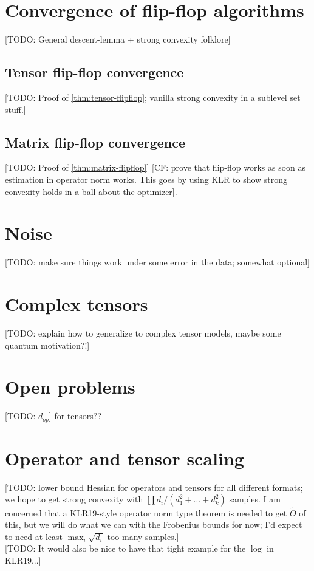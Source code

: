 \documentclass{article}
\newcommand{\CF}[1]{{\color{purple}[CF: #1]}}
\newcommand{\TODO}[1]{{\color{blue}[TODO: #1]}}
\begin{document}
\section{Convergence of flip-flop algorithms}
\TODO{General descent-lemma + strong convexity folklore}
\subsection{Tensor flip-flop convergence}
\TODO{Proof of \cref{thm:tensor-flipflop}; vanilla strong convexity in a sublevel set stuff.}
\subsection{Matrix flip-flop convergence}
\TODO{Proof of \cref{thm:matrix-flipflop}}
\CF{prove that flip-flop works as soon as estimation in operator norm works. This goes by using KLR to show strong convexity holds in a ball about the optimizer}.






\section{Noise}
\TODO{make sure things work under some error in the data; somewhat optional}


\section{Complex tensors}
\TODO{explain how to generalize to complex tensor models, maybe some quantum motivation?!}

\section{Open problems}
\TODO{$d_{op}$} for tensors??








\appendix




\section{Operator and tensor scaling}\label{sec:scaling}
\TODO{lower bound Hessian for operators and tensors for all different formats; we hope to get strong convexity with $\prod d_i /(d_1^2 + \dots + d_k^2)$ samples. I am concerned that a KLR19-style operator norm type theorem is needed to get $\tilde{O}$ of this, but we will do what we can with the Frobenius bounds for now; I'd expect to need at least $\max_i \sqrt{d_i}$ too many samples.}\\
\TODO{It would also be nice to have that tight example for the $\log$ in KLR19...}
\end{document}
